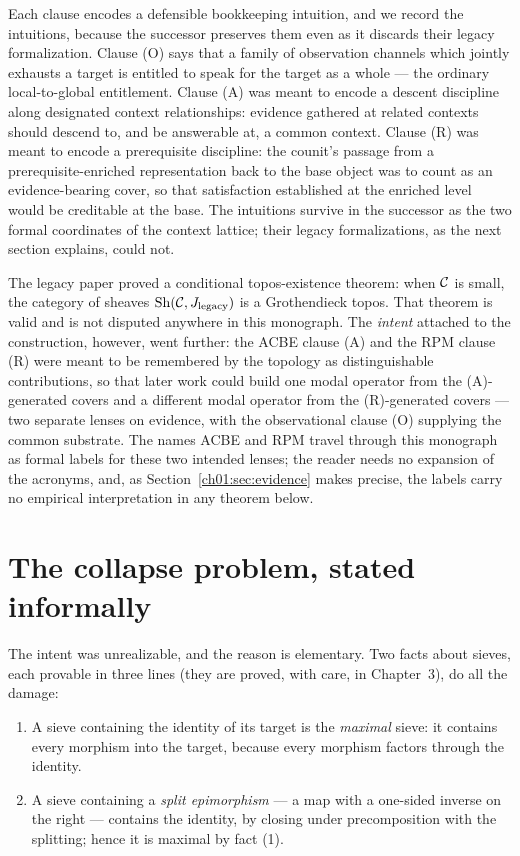 Each clause encodes a defensible bookkeeping intuition, and we record
the intuitions, because the successor preserves them even as it
discards their legacy formalization. Clause (O) says that a family of
observation channels which jointly exhausts a target is entitled to speak
for the target as a whole --- the ordinary local-to-global entitlement.
Clause (A) was meant to encode a descent discipline along designated
context relationships: evidence gathered at related contexts should
descend to, and be answerable at, a common context. Clause (R) was meant
to encode a prerequisite discipline: the counit's passage from a
prerequisite-enriched representation back to the base object was to count
as an evidence-bearing cover, so that satisfaction established at the
enriched level would be creditable at the base. The intuitions survive in
the successor as the two formal coordinates of the context lattice; their
legacy formalizations, as the next section explains, could not.

The legacy paper proved a conditional topos-existence theorem: when $\mathcal{C}$ is
small, the category of sheaves $\mathrm{Sh}(\mathcal{C}, J_{\mathrm{legacy}})$ is a
Grothendieck topos. That theorem is valid and is not disputed anywhere in
this monograph. The \emph{intent} attached to the construction, however,
went further: the ACBE clause (A) and the RPM clause (R) were meant to be
remembered by the topology as distinguishable contributions, so that later
work could build one modal operator from the (A)-generated covers and a
different modal operator from the (R)-generated covers --- two separate
lenses on evidence, with the observational clause (O) supplying the common
substrate. The names ACBE and RPM travel through this monograph as formal
labels for these two intended lenses; the reader needs no expansion of the
acronyms, and, as Section~\ref{ch01:sec:evidence} makes precise, the labels
carry no empirical interpretation in any theorem below.

\section{The collapse problem, stated informally}\label{ch01:sec:collapse}

The intent was unrealizable, and the reason is elementary. Two facts about
sieves, each provable in three lines (they are proved, with care, in
Chapter~3), do all the damage:

\begin{enumerate}
\item A sieve containing the identity of its target is the \emph{maximal}
sieve: it contains every morphism into the target, because every morphism
factors through the identity.
\item A sieve containing a \emph{split epimorphism} --- a map with a
one-sided inverse on the right --- contains the identity, by closing under
precomposition with the splitting; hence it is maximal by fact (1).
\end{enumerate}

